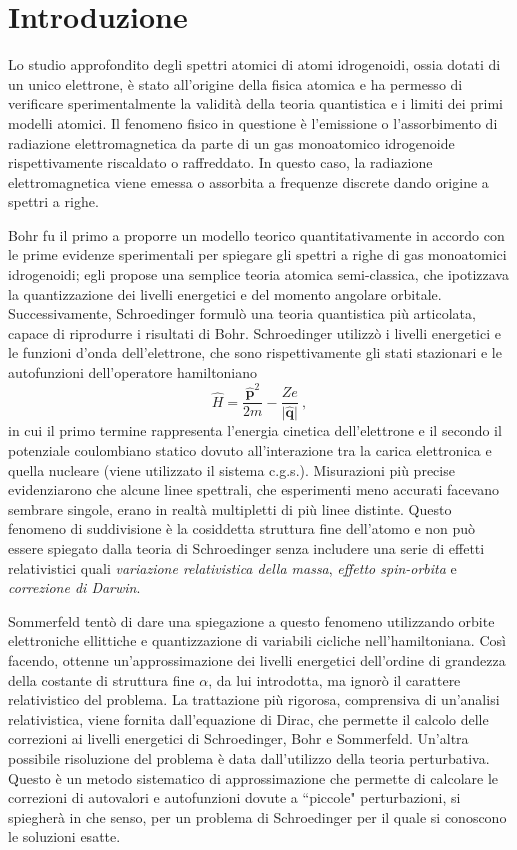 \documentclass[12pt,a4paper]{report}
\numberwithin{equation}{section}
\numberwithin{section}{chapter}
\begin{document}
\chapter*{Introduzione}

	Lo studio approfondito degli spettri atomici di atomi idrogenoidi, ossia dotati di un unico elettrone, \`e stato all'origine della fisica atomica e ha permesso di verificare sperimentalmente la validit\`a della teoria quantistica e i limiti dei primi modelli atomici. Il fenomeno fisico in questione \`e l'emissione o l'assorbimento di radiazione elettromagnetica da parte di un gas monoatomico idrogenoide rispettivamente riscaldato o raffreddato. In questo caso, la radiazione elettromagnetica viene emessa o assorbita a frequenze discrete dando origine a spettri a righe. 
	
	Bohr fu il primo a proporre un modello teorico quantitativamente in accordo con le prime evidenze sperimentali per spiegare gli spettri a righe di gas monoatomici idrogenoidi; egli propose una semplice teoria atomica semi-classica, che ipotizzava la quantizzazione dei livelli energetici e del momento angolare orbitale. 
	Successivamente, Schroedinger formul\`o una teoria quantistica pi\`u articolata, capace di riprodurre i risultati di Bohr. Schroedinger utilizzò i livelli energetici e le funzioni d'onda dell'elettrone, che sono rispettivamente gli stati stazionari e le autofunzioni dell'operatore hamiltoniano
	\begin{equation*}
		\widehat{H} = \frac{\boldsymbol{\widehat{p}}^2}{2m} - \frac{Ze}{|\mathbf{\widehat{q}|}} ~,
	\end{equation*}
	in cui il primo termine rappresenta l'energia cinetica dell'elettrone e il secondo il potenziale coulombiano statico dovuto all'interazione tra la carica elettronica e quella nucleare (viene utilizzato il sistema c.g.s.).
	Misurazioni pi\`u precise evidenziarono che alcune linee spettrali, che esperimenti meno accurati facevano sembrare singole, erano in realt\`a multipletti di pi\`u linee distinte.
	Questo fenomeno di suddivisione \`e la cosiddetta struttura fine dell'atomo e non pu\`o essere spiegato dalla teoria di Schroedinger senza includere una serie di effetti relativistici quali \textit{variazione relativistica della massa}, \textit{effetto spin-orbita} e \textit{correzione di Darwin}.
	
	Sommerfeld tent\`o di dare una spiegazione a questo fenomeno utilizzando orbite elettroniche ellittiche e quantizzazione di variabili cicliche nell'hamiltoniana. Così facendo, ottenne un'approssimazione dei livelli energetici dell'ordine di grandezza della costante di struttura fine $\alpha$, da lui introdotta, ma ignor\`o il carattere relativistico del problema.
	La trattazione pi\`u rigorosa, comprensiva di un'analisi relativistica, viene fornita dall'equazione di Dirac, che permette il calcolo delle correzioni ai livelli energetici di Schroedinger, Bohr e Sommerfeld.
	Un'altra possibile risoluzione del problema \`e data dall'utilizzo della teoria perturbativa. Questo \`e un metodo sistematico di approssimazione che permette di calcolare le correzioni di autovalori e autofunzioni dovute a ``piccole" perturbazioni, si spiegher\`a in che senso, per un problema di Schroedinger per il quale si conoscono le soluzioni esatte.
	
\end{document}
